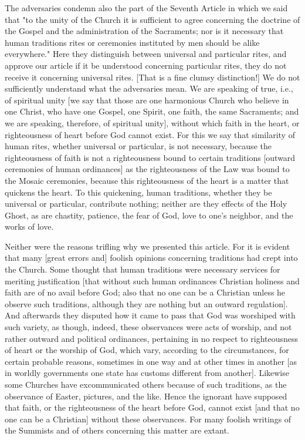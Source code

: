 The adversaries condemn also the part of the Seventh Article in which
we said that "to the unity of the Church it is sufficient to agree
concerning the doctrine of the Gospel and the administration of the
Sacraments; nor is it necessary that human traditions rites or
ceremonies instituted by men should be alike everywhere." Here they
distinguish between universal and particular rites, and approve our
article if it be understood concerning particular rites, they do not
receive it concerning universal rites.  [That is a fine clumsy
distinction!] We do not sufficiently understand what the adversaries
mean.  We are speaking of true, i.e., of spiritual unity [we say that
those are one harmonious Church who believe in one Christ, who have
one Gospel, one Spirit, one faith, the same Sacraments; and we are
speaking, therefore, of spiritual unity], without which faith in the
heart, or righteousness of heart before God cannot exist.  For this
we say that similarity of human rites, whether universal or
particular, is not necessary, because the righteousness of faith is
not a righteousness bound to certain traditions [outward ceremonies
of human ordinances] as the righteousness of the Law was bound to the
Mosaic ceremonies, because this righteousness of the heart is a
matter that quickens the heart.  To this quickening, human traditions,
whether they be universal or particular, contribute nothing; neither
are they effects of the Holy Ghost, as are chastity, patience, the
fear of God, love to one's neighbor, and the works of love.

Neither were the reasons trifling why we presented this article.  For
it is evident that many [great errors and] foolish opinions
concerning traditions had crept into the Church.  Some thought that
human traditions were necessary services for meriting justification
[that without such human ordinances Christian holiness and faith are
of no avail before God; also that no one can be a Christian unless he
observe such traditions, although they are nothing but an outward
regulation].  And afterwards they disputed how it came to pass that
God was worshiped with such variety, as though, indeed, these
observances were acts of worship, and not rather outward and
political ordinances, pertaining in no respect to righteousness of
heart or the worship of God, which vary, according to the
circumstances, for certain probable reasons, sometimes in one way and
at other times in another [as in worldly governments one state has
customs different from another].  Likewise some Churches have
excommunicated others because of such traditions, as the observance
of Easter, pictures, and the like.  Hence the ignorant have supposed
that faith, or the righteousness of the heart before God, cannot
exist [and that no one can be a Christian] without these observances.
For many foolish writings of the Summists and of others concerning
this matter are extant.

